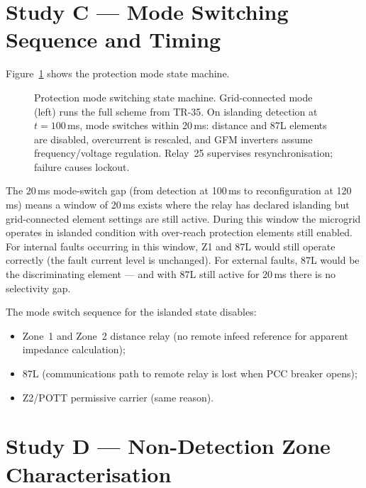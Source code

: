 \documentclass[11pt,a4paper]{article}
\begin{document}
\section{Study C --- Mode Switching Sequence and Timing}
\label{sec:studyC}

Figure~\ref{fig:modeswitch} shows the protection mode state machine.

\begin{figure}[htbp]
  \centering
  \resizebox{0.92\textwidth}{!}{}
  \caption{Protection mode switching state machine.  Grid-connected mode
           (left) runs the full scheme from TR-35.  On islanding detection
           at $t=100$\,ms, mode switches within 20\,ms: distance and 87L
           elements are disabled, overcurrent is rescaled, and GFM inverters
           assume frequency/voltage regulation.  Relay~25 supervises
           resynchronisation; failure causes lockout.}
  \label{fig:modeswitch}
\end{figure}

\noindent
The 20\,ms mode-switch gap (from detection at 100\,ms to reconfiguration at
120\,ms) means a window of 20\,ms exists where the relay has declared islanding
but grid-connected element settings are still active.  During this window the
microgrid operates in islanded condition with over-reach protection elements
still enabled.  For internal faults occurring in this window, Z1 and 87L would
still operate correctly (the fault current level is unchanged).  For external
faults, 87L would be the discriminating element --- and with 87L still active
for 20\,ms there is no selectivity gap.

The mode switch sequence for the islanded state disables:
\begin{itemize}
  \item Zone~1 and Zone~2 distance relay (no remote infeed reference for
    apparent impedance calculation);
  \item 87L (communications path to remote relay is lost when PCC breaker opens);
  \item Z2/POTT permissive carrier (same reason).
\end{itemize}

\section{Study D --- Non-Detection Zone Characterisation}
\label{sec:studyD}
\end{document}
